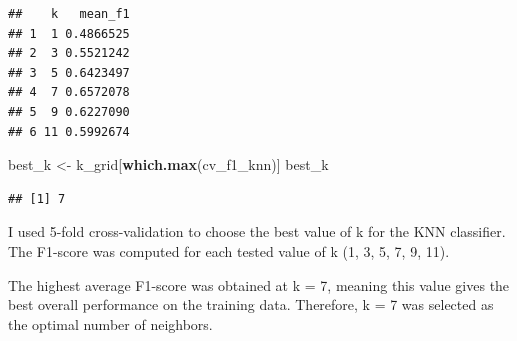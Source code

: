 \documentclass[
]{article}
\newenvironment{Shaded}{\begin{snugshade}}{\end{snugshade}}
\newcommand{\AttributeTok}[1]{\textcolor[rgb]{0.13,0.29,0.53}{#1}}
\newcommand{\FunctionTok}[1]{\textcolor[rgb]{0.13,0.29,0.53}{\textbf{#1}}}
\newcommand{\NormalTok}[1]{#1}
\newcommand{\OtherTok}[1]{\textcolor[rgb]{0.56,0.35,0.01}{#1}}
\newcommand{\SpecialCharTok}[1]{\textcolor[rgb]{0.81,0.36,0.00}{\textbf{#1}}}
\newcommand{\StringTok}[1]{\textcolor[rgb]{0.31,0.60,0.02}{#1}}
\begin{document}
\begin{verbatim}
##    k   mean_f1
## 1  1 0.4866525
## 2  3 0.5521242
## 3  5 0.6423497
## 4  7 0.6572078
## 5  9 0.6227090
## 6 11 0.5992674
\end{verbatim}

\begin{Shaded}
\begin{Highlighting}[]
\NormalTok{best\_k }\OtherTok{\textless{}{-}}\NormalTok{ k\_grid[}\FunctionTok{which.max}\NormalTok{(cv\_f1\_knn)]}
\NormalTok{best\_k}
\end{Highlighting}
\end{Shaded}

\begin{verbatim}
## [1] 7
\end{verbatim}

I used 5-fold cross-validation to choose the best value of k for the KNN
classifier. The F1-score was computed for each tested value of k (1, 3,
5, 7, 9, 11).

The highest average F1-score was obtained at k = 7, meaning this value
gives the best overall performance on the training data. Therefore, k =
7 was selected as the optimal number of neighbors.

\begin{Shaded}
\end{Shaded}
\end{document}
